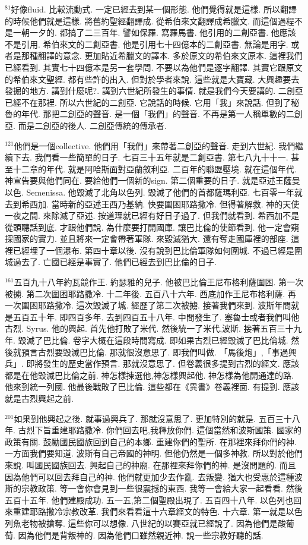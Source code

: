 \documentclass{book}
\begin{document}
$^{81}$好像fluid.
比較流動式.
一定已經去到某一個形態.
他們覺得就是這樣.
所以翻譯的時候他們就是這樣.
將舊約聖經翻譯成.
從希伯來文翻譯成希臘文.
而這個過程不是一朝一夕的.
都搞了二三百年.
譬如保羅.
寫羅馬書.
他引用的二創亞書.
他應該不是引用.
希伯來文的二創亞書.
他是引用七十四億本的二創亞書.
無論是用字.
或者是那種翻譯的意念.
更加貼近希臘文的譯本.
多於原文的希伯來文原本.
這裡我們已經看到.
其實七十四億本是另一套學問.
不要以為他們是逐字翻譯.
其實它跟原文的希伯來文聖經.
都有些許的出入.
但對於學者來說.
這些就是大寶藏.
大興趣要去發掘的地方.
講到什麼呢?.
講到六世紀所發生的事情.
就是我們今天要講的.
二創亞已經不在那裡.
所以六世紀的二創亞.
它說話的時候.
它用「我」來說話.
但到了秘魯的年代.
那把二創亞的聲音.
是一個「我們」的聲音.
不再是第一人稱單數的二創亞.
而是二創亞的後人.
二創亞傳統的傳承者.

$^{121}$他們是一個collective.
他們用「我們」來帶著二創亞的聲音.
走到六世紀.
我們繼續下去.
我們看一些簡單的日子.
七百三十五年就是二創亞書.
第七八九十十一.
甚至十二章的年代.
就是阿哈斯面對亞蘭敘利亞.
二百年的聯盟壓境.
就在這個年代.
神宣告要與他們同在.
要給他們一個新的sign.
第二個重要的日子.
就是亞述王薩曼以色.
Semenissa.
他毀滅了北角以色列.
毀滅了他們的首都薩瑪利亞.
七百零一年就去到希西加.
當時新的亞述王西乃基納.
快要圍困耶路撒冷.
但得著解救.
神的天使一夜之間.
來除滅了亞述.
按道理就已經有好日子過了.
但我們就看到.
希西加不是從頭聽話到底.
才跟他們說.
為什麼要打開國庫.
讓巴比倫的使節看到.
他一定會窺探國家的實力.
並且將來一定會帶著軍隊.
來毀滅猶大.
還有奪走國庫裡的部座.
這裡已經埋了一個瀑布.
第四十章以後.
沒有說到巴比倫軍隊如何圍城.
不過已經是圍城過去了.
亡國已經是事實了.
他們已經去到巴比倫的日子.

$^{161}$五百九十八年約瓦競作王.
約瑟雅的兒子.
他被巴比倫王尼布格利薩圍困.
第一次被擄.
第二次圍困耶路撒冷.
十二年後.
五百八十六年.
西底加作王尼布格利薩.
再一次圍困耶路撒冷.
這次毀滅了城.
經歷了第二次被擄.
接著我們來到.
波斯年間就是五百五十年.
即四百多年.
去到四百五十八年.
中間發生了.
塞魯士或者我們叫他古烈.
Syrus.
他的興起.
首先他打敗了米代.
然後統一了米代,波斯.
接著五百三十九年.
毀滅了巴比倫.
卷字大概在這段時間寫成.
即如果古烈已經毀滅了巴比倫城.
然後就預言古烈要毀滅巴比倫.
那就很沒意思了.
即我們叫做.
「馬後炮」,「事過興兵」.
即將發生的歷史當作預言.
那就沒意思了.
但卷義很多提到古烈的經文.
應該都是在他毀滅巴比倫之前.
神怎樣揀選他,神怎樣興起他.
神怎樣為他開通達的路.
他來到統一列國.
他最後戰敗了巴比倫.
這些都在《異書》卷義裡面.
有提到.
應該就是古烈興起之前.

$^{201}$如果到他興起之後.
就事過興兵了.
那就沒意思了.
更加特別的就是.
五百三十八年.
古烈下旨重建耶路撒冷.
你們回去吧,我釋放你們.
這個當然和波斯國策.
國家的政策有關.
鼓勵國民國族回到自己的本鄉.
重建你們的聖所.
在那裡來拜你們的神.
一方面我們要知道.
波斯有自己帝國的神明.
但他仍然是一個多神教.
所以對於他們來說.
叫國民國族回去.
興起自己的神廟.
在那裡來拜你們的神.
是沒問題的.
而且因為他們可以回去拜自己的神.
他們就更加少去作亂.
去叛變.
猶大也受惠於這種波斯的宗教政策.
等一會你會見到一些很震撼的東西.
我等一會給大家一起看看.
然後五百十五年.
他們建殿成功.
五一五,第二個聖殿出現了.
五百四十八年.
以色列也回來重建耶路撒冷宗教改革.
我們來看看這十六章經文的特色.
十六章.
第一就是以色列魚老物被搶奪.
這些你可以想像.
八世紀的以賽亞就已經說了.
因為他們是酸葡萄.
因為他們是背叛神的.
因為他們口雖然親近神.
說一些宗教好聽的話.
\end{document}
